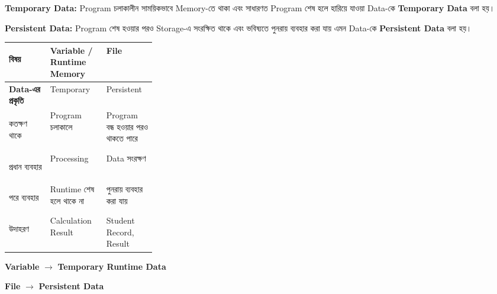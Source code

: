 

\begin{definitionbox}

\textbf{Temporary Data:}
Program চলাকালীন সাময়িকভাবে Memory-তে থাকা এবং সাধারণত Program
শেষ হলে হারিয়ে যাওয়া Data-কে \textbf{Temporary Data} বলা হয়।

\medskip

\textbf{Persistent Data:}
Program শেষ হওয়ার পরও Storage-এ সংরক্ষিত থাকে এবং ভবিষ্যতে
পুনরায় ব্যবহার করা যায় এমন Data-কে \textbf{Persistent Data} বলা হয়।

\end{definitionbox}

\begin{tabularx}
{\linewidth}
{
|>{\bfseries\RaggedRight\arraybackslash}p{0.29\linewidth}
|Y
|Y|
}

\hline
{}

\textbf{বিষয়}
&
\textbf{Variable / Runtime Memory}
&
\textbf{File}
\\
\hline

Data-এর প্রকৃতি
&
Temporary
&
Persistent
\\
\hline

কতক্ষণ থাকে
&
Program চলাকালে
&
Program বন্ধ হওয়ার পরও থাকতে পারে
\\
\hline

প্রধান ব্যবহার
&
Processing
&
Data সংরক্ষণ
\\
\hline

পরে ব্যবহার
&
Runtime শেষ হলে থাকে না
&
পুনরায় ব্যবহার করা যায়
\\
\hline

উদাহরণ
&
Calculation Result
&
Student Record, Result
\\
\hline

\end{tabularx}

\begin{rememberbox}

\begin{center}

\textbf{Variable}
\(\longrightarrow\)
\textbf{Temporary Runtime Data}

\qquad

\textbf{File}
\(\longrightarrow\)
\textbf{Persistent Data}

\end{center}

\end{rememberbox}

